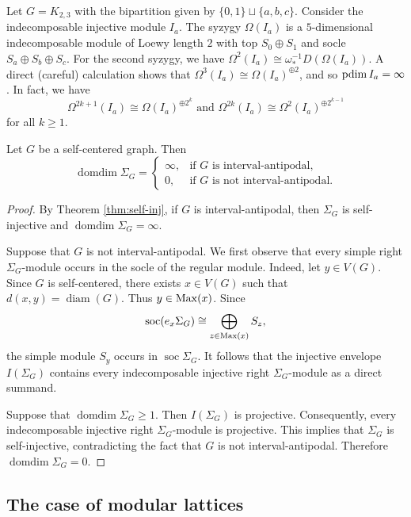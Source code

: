 \documentclass[a4paper,leqno]{amsart}
\begin{document}
\begin{eg}\label{eg:idim K2,3}
Let $G=K_{2,3}$ with the bipartition given by $\{0,1\}\sqcup \{a,b,c\}$.
Consider the indecomposable injective module $I_a$. The syzygy $\Omega(I_a)$ is a $5$-dimensional indecomposable module of Loewy length $2$ with top $S_0\oplus S_1$ and socle $S_{a}\oplus S_{b} \oplus S_{c}$.
For the second syzygy, we have $\Omega^2(I_a) \cong \omega_*^{-1}D(\Omega(I_a))$.  A direct (careful) calculation shows that $\Omega^3(I_a) \cong \Omega(I_a)^{\oplus 2}$, and so $\operatorname{pdim} I_a = \infty$.  In fact, we have
\[
\Omega^{2k+1}(I_a) \cong \Omega(I_a)^{\oplus 2^k} \text{ and }\Omega^{2k}(I_a) \cong \Omega^{2}(I_a)^{\oplus 2^{k-1}}
\]
for all $k\ge 1$.
\end{eg}

\begin{prop}
Let $G$ be a self-centered graph. Then
\[
\operatorname{domdim} \Sigma_G=
\begin{cases}
\infty, & \text{if $G$ is interval-antipodal},\\
0,      & \text{if $G$ is not interval-antipodal}.
\end{cases}
\]
\end{prop}

\begin{proof}
By Theorem \ref{thm:self-inj}, if $G$ is interval-antipodal, then $\Sigma_G$ is self-injective and $\operatorname{domdim}\Sigma_G=\infty$.

Suppose that $G$ is not interval-antipodal. We first observe that every simple right $\Sigma_G$-module occurs in the socle of the regular module. Indeed, let $y\in V(G)$. Since $G$ is self-centered, there exists
$x\in V(G)$ such that $d(x,y)=\operatorname{diam}(G)$. Thus $y\in\operatorname{Max}(x)$. Since
\[\operatorname{soc}(e_x\Sigma_G)\cong \bigoplus_{z\in\operatorname{Max}(x)}S_z,\]
the simple module $S_y$ occurs in $\operatorname{soc}\Sigma_G$. It follows that the injective envelope $I(\Sigma_G)$ contains every indecomposable injective right $\Sigma_G$-module as a direct summand.

Suppose that $\operatorname{domdim}\Sigma_G\geq1$. Then $I(\Sigma_G)$ is projective. Consequently, every indecomposable injective right $\Sigma_G$-module is projective. This implies that $\Sigma_G$ is
self-injective, contradicting the fact that $G$ is not interval-antipodal. Therefore $\operatorname{domdim}\Sigma_G=0$.
\end{proof}


\subsection{The case of modular lattices}
\end{document}
